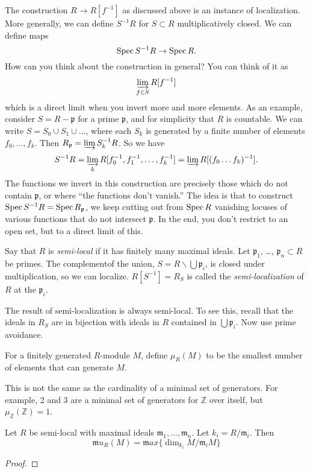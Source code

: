 \begin{remark} 
The construction $R \to R[f^{-1}]$ as discussed above is an
instance of
localization. More generally, we can define $S^{-1}R$ for $S
\subset R$
multiplicatively closed. We can define maps
\[ \operatorname{Spec} S^{-1}R \to \operatorname{Spec} R . \]
How can you think about the construction in general? You can
think of it as
\[ \varinjlim_{f \in S} R[f^{-1}]  \]
which is a direct limit when you invert more and more elements.
As an example, consider $S = R - \mathfrak{p}$ for a prime
$\mathfrak{p}$, and for
simplicity that $R$ is countable. We can write $S =
S_0 \cup S_1 \cup \dots$, where each $S_k$ is generated by a
finite number of
elements $f_0, \dots, f_k$. Then $R_{\mathfrak{p}} = \varinjlim
S_k^{-1} R$.
So we have
\[ S^{-1}R = \varinjlim_k R[f_0^{-1} , f_1^{-1}, \dots, f_k^{-1}
] = \varinjlim
R[(f_0\dots f_k)^{-1}]. \]
The functions we invert in this construction are precisely those
which do not
contain $\mathfrak{p}$, or where ``the functions don't vanish.''
The idea is
that to construct $\operatorname{Spec} S^{-1}R = \operatorname{Spec} R_{\mathfrak{p}}$, we
keep cutting out
from $\operatorname{Spec} R$ vanishing locuses of various functions that do
not
intersect $\mathfrak{p}$. In the end, you don't restrict to an
open set, but
to a direct limit of this.
\end{remark} 
\begin{exercise} 
Say that    $R$ is \emph{semi-local} if it has finitely many maximal ideals.
Let $\mathfrak{p}_1$, \dots, $\mathfrak{p}_n\subset R$ be primes. The complementof
the union, $S=R\smallsetminus \bigcup \mathfrak{p}_i$, is closed under
multiplication, so we can
 localize. $R[S^{-1}] = R_S$ is called the \emph{semi-localization}
  of $R$ at the $\mathfrak{p}_i$.
 
The result of semi-localization is always semi-local. To see this, recall that
the ideals
 in $R_S$ are in bijection with ideals in $R$ contained in $\bigcup
 \mathfrak{p}_i$. Now use prime avoidance.
\end{exercise}

\begin{definition}
For a finitely generated $R$-module $M$, define $\mu_R(M)$ to be the smallest
number
   of elements that can generate $M$.
 \end{definition}
This is not the same as the cardinality of a minimal set of generators. For
example, 2
and 3 are a minimal set of generators for $\mathbb{Z}$ over itself, but
$\mu_\mathbb{Z} (\mathbb{Z}) =1$.

 \begin{theorem}
Let $R$ be semi-local with maximal ideals $\mathfrak{m}_1,\dots,
\mathfrak{m}_n$. Let $k_i = R/\mathfrak{m}_i$. Then
   \[
     \mathfrak{m}u_R(M) = \mathfrak{m}ax \{\dim_{k_i} M/\mathfrak{m}_i M\}
   \]
 \end{theorem}
\begin{proof} 
\end{proof} 

